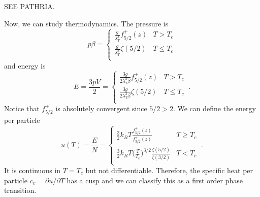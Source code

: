     SEE PATHRIA.

    Now, we can study thermodynamics. The pressure is 
    \begin{equation*}
        p \beta = \begin{cases}
            \frac{g}{\lambda_T^3} f^+_{5/2} (z)  & T > T_c \\
            \frac{g}{\lambda_T^3} \zeta(5/2)  & T \leq T_c \\
        \end{cases}
    \end{equation*}
    and energy is
    \begin{equation}\label{eeee}
        E = \frac{3pV}{2} = \begin{cases}
            \frac{3 g}{2 \lambda_T^3 \beta} f^+_{5/2} (z) & T > T_c \\
            \frac{3 g}{2 \lambda_T^3 \beta} \zeta(5/2) & T \leq T_c \\
        \end{cases} ~.
    \end{equation} 
    Notice that $f^+_{5/2}$ is absolutely convergent since $5/2 > 2$. We can define the energy per particle 
    \begin{equation*}
        u(T) = \frac{E}{N} = \begin{cases}
            \frac{3}{2} k_B T \frac{f^+_{5/2} (z)}{f^+_{3/2} (z)} & T \geq T_c \\
            \frac{3}{2} k_B T \Big ( \frac{T}{T_c} \Big)^{3/2} \frac{\zeta(5/2)}{\zeta(3/2)} & T < T_c \\
        \end{cases} ~.
    \end{equation*}
    It is continuous in $T=T_c$ but not differentiable. Therefore, the specific heat per particle $c_v = \partial u / \partial T$ has a cusp and we can classify this as a first order phase transition.
